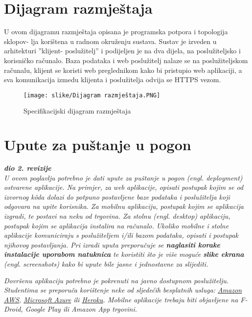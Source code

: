 			\eject 
		
		
		\section{Dijagram razmještaja}
			
		U ovom dijagramu razmještaja opisana je programska potpora i topologija sklopov-
		lja korištena u radnom okruženju sustava. Sustav je izveden u arhitekturi ”klijent-
		poslužitelj” i podijeljen je na dva dijela, na poslužiteljsko i korisničko računalo.
		Baza podataka i web poslužitelj nalaze se na poslužiteljskom računalu, klijent se
		koristi web preglednikom kako bi pristupio web aplikaciji, a sva komunikacija
		izmedu klijenta i poslužitelja odvija se HTTPS vezom.
		
		\begin{figure}[H]
			\texttt{[image: slike/Dijagram razmještaja.PNG]} %
			\centering
			\caption{Specifikacijski dijagram razmještaja}
			\label{fig:promjene}
		\end{figure}
			
			\eject 
		
		\section{Upute za puštanje u pogon}
		
			\textbf{\textit{dio 2. revizije}}\\
		
			 \textit{U ovom poglavlju potrebno je dati upute za puštanje u pogon (engl. deployment) ostvarene aplikacije. Na primjer, za web aplikacije, opisati postupak kojim se od izvornog kôda dolazi do potpuno postavljene baze podataka i poslužitelja koji odgovara na upite korisnika. Za mobilnu aplikaciju, postupak kojim se aplikacija izgradi, te postavi na neku od trgovina. Za stolnu (engl. desktop) aplikaciju, postupak kojim se aplikacija instalira na računalo. Ukoliko mobilne i stolne aplikacije komuniciraju s poslužiteljem i/ili bazom podataka, opisati i postupak njihovog postavljanja. Pri izradi uputa preporučuje se \textbf{naglasiti korake instalacije uporabom natuknica} te koristiti što je više moguće \textbf{slike ekrana} (engl. screenshots) kako bi upute bile jasne i jednostavne za slijediti.}
			
			
			 \textit{Dovršenu aplikaciju potrebno je pokrenuti na javno dostupnom poslužitelju. Studentima se preporuča korištenje neke od sljedećih besplatnih usluga: \href{https://aws.amazon.com/}{Amazon AWS}, \href{https://azure.microsoft.com/en-us/}{Microsoft Azure} ili \href{https://www.heroku.com/}{Heroku}. Mobilne aplikacije trebaju biti objavljene na F-Droid, Google Play ili Amazon App trgovini.}
			
			
			\eject 